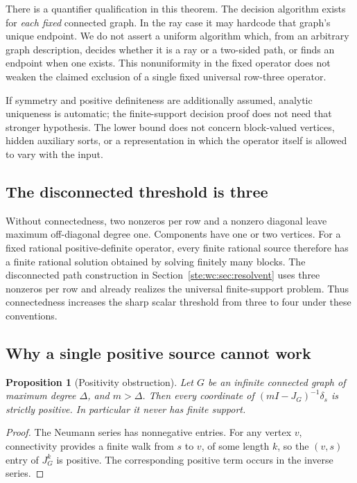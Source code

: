 \documentclass[11pt,letterpaper]{article}
\newtheorem{proposition}[theorem]{Proposition}
\theoremstyle{definition}
\theoremstyle{remark}
\begin{document}
There is a quantifier qualification in this theorem. The decision algorithm
exists for \emph{each fixed} connected graph. In the ray case it may hardcode
that graph's unique endpoint. We do not assert a uniform algorithm which,
from an arbitrary graph description, decides whether it is a ray or a
two-sided path, or finds an endpoint when one exists. This nonuniformity
in the fixed operator does not weaken the claimed exclusion of a single
fixed universal row-three operator.

If symmetry and positive definiteness are additionally assumed, analytic
uniqueness is automatic; the finite-support decision proof does not need
that stronger hypothesis. The lower bound does not concern block-valued
vertices, hidden auxiliary sorts, or a representation in which the
operator itself is allowed to vary with the input.

\subsection{The disconnected threshold is three}
Without connectedness, two nonzeros per row and a nonzero diagonal leave
maximum off-diagonal degree one. Components have one or two vertices. For
a fixed rational positive-definite operator, every finite rational source
therefore has a finite rational solution obtained by solving finitely
many blocks. The disconnected path construction in Section~\ref{ste:wc:sec:resolvent}
uses three nonzeros per row and already realizes the universal
finite-support problem. Thus connectedness increases the sharp scalar
threshold from three to four under these conventions.

\subsection{Why a single positive source cannot work}
\begin{proposition}[Positivity obstruction]\label{ste:wc:prop:positive}
Let $G$ be an infinite connected graph of maximum degree $\Delta$, and
$m>\Delta$. Then every coordinate of $(mI-J_G)^{-1}\delta_s$ is strictly
positive. In particular it never has finite support.
\end{proposition}
\begin{proof}
The Neumann series has nonnegative entries. For any vertex $v$, connectivity
provides a finite walk from $s$ to $v$, of some length $k$, so the
$(v,s)$ entry of $J_G^k$ is positive. The corresponding positive term
occurs in the inverse series.
\end{proof}
\end{document}

